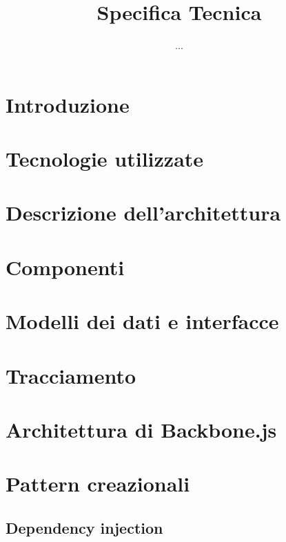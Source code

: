 


\author{...}
\dest{\ALL}
\title{Specifica Tecnica}


\maketitle

\tableofcontents
\listofpattern



\section{Introduzione}


\section{Tecnologie utilizzate}


\section{Descrizione dell'architettura}


\section{Componenti}


\section{Modelli dei dati e interfacce}


\section{Tracciamento}




\appendix

\section{Architettura di Backbone.js}

\section{Pattern creazionali}
\subsection{Dependency injection}




